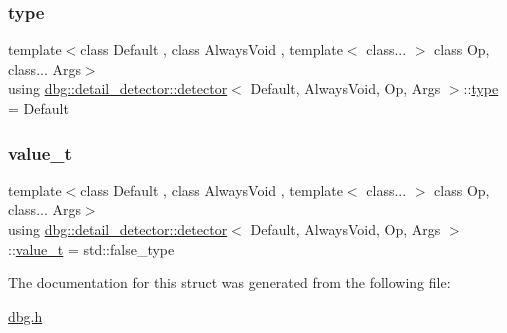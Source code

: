 \subsubsection{\texorpdfstring{type}{type}}
{\footnotesize\ttfamily template$<$class Default , class Always\+Void , template$<$ class... $>$ class Op, class... Args$>$ \\
using \hyperlink{structdbg_1_1detail__detector_1_1detector}{dbg\+::detail\+\_\+detector\+::detector}$<$ Default, Always\+Void, Op, Args $>$\+::\hyperlink{structdbg_1_1detail__detector_1_1detector_aab6b446944545683b9533ea8fc623480}{type} =  Default}

\mbox{\label{structdbg_1_1detail__detector_1_1detector_af1b6da4282d723669e926c52f446a989}} 
\subsubsection{\texorpdfstring{value\+\_\+t}{value\_t}}
{\footnotesize\ttfamily template$<$class Default , class Always\+Void , template$<$ class... $>$ class Op, class... Args$>$ \\
using \hyperlink{structdbg_1_1detail__detector_1_1detector}{dbg\+::detail\+\_\+detector\+::detector}$<$ Default, Always\+Void, Op, Args $>$\+::\hyperlink{structdbg_1_1detail__detector_1_1detector_af1b6da4282d723669e926c52f446a989}{value\+\_\+t} =  std\+::false\+\_\+type}



The documentation for this struct was generated from the following file\+:\begin{DoxyCompactItemize}
\item 
\hyperlink{dbg_8h}{dbg.\+h}\end{DoxyCompactItemize}
